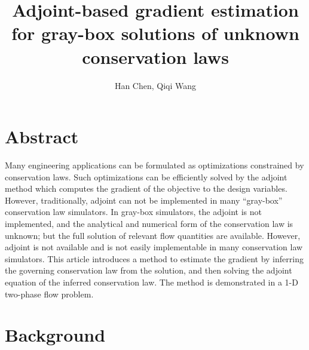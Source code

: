\documentclass[a4paper,onecolumn]{article}
\theoremstyle{remark}
\begin{document}
\title{Adjoint-based gradient estimation for gray-box solutions of unknown conservation laws}
\author{Han Chen, Qiqi Wang}
\date{}
\maketitle
\section{Abstract}

\noindent
Many engineering applications can be formulated as optimizations constrained by conservation laws.
Such optimizations can be efficiently solved by the adjoint method which computes the gradient of
the objective to the design variables.
However, traditionally, adjoint can not be implemented in many ``gray-box'' conservation law 
simulators. In gray-box simulators, the adjoint is not implemented, and the analytical and numerical
form of the conservation law is unknown; but the full solution of relevant flow quantities are
available.
However, adjoint is not available and is not easily implementable in many conservation law simulators.
This article introduces a method to estimate the gradient by
inferring the governing conservation law from the solution, and then solving the adjoint equation of
the inferred conservation law.
The method is demonstrated in a 1-D two-phase flow problem.


\section{Background}
\label{background}
\end{document}
